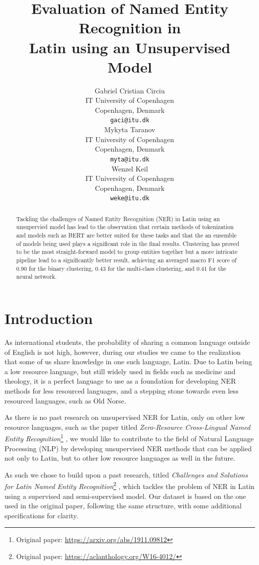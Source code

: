 \documentclass[11pt]{article}
\title{Evaluation of Named Entity Recognition in \\ Latin using an Unsupervised Model}
\author{
  Gabriel Cristian Circiu \\
  IT University of Copenhagen \\ Copenhagen, Denmark \\
  \texttt{gaci@itu.dk} \\\And
  Mykyta Taranov \\
  IT University of Copenhagen \\ Copenhagen, Denmark \\
  \texttt{myta@itu.dk} \\\And
  Wenzel Keil \\
  IT University of Copenhagen \\ Copenhagen, Denmark \\
  \texttt{weke@itu.dk}
}
\begin{document}
\maketitle
\begin{abstract}
Tackling the challenges of Named Entity Recognition (NER) in Latin using an unsupervied model has lead to the observation that certain methods of
tokenization and models such as BERT are better suited for these tasks and that the an ensemble of models being used plays a significant
role in the final results.
Clustering has proved to be the most straight-forward model to group entities together but a more intricate pipeline lead to a significantly 
better result, achieving an averaged macro F1 score of 0.90 for the binary clustering, 0.43 for the multi-class clustering, 
and 0.41 for the neural network.
\end{abstract}

\section{Introduction}

As international students, the probability of sharing a common language outside of English is not high, however, during our studies we came to the 
realization that some of us share knowledge in one such language, Latin. Due to Latin being a low resource language, but still widely used in fields
such as medicine and theology, it is a perfect language to use as a foundation for developing NER methods for less resourced languages, and a
stepping stone towards even less resourced languages, such as Old Norse.

As there is no past research on unsupervised NER for Latin, only on other low resource languages, such as the paper titled
\textit{Zero-Resource Cross-Lingual Named Entity Recognition}\footnote{Original paper: \url{https://arxiv.org/abs/1911.09812}}
\cite{bari2019zeroresourcecrosslingualnamedentity}, we would like to contribute to the field of Natural Language Processing (NLP) by
developing unsupervised NER methods that can be applied not only to Latin, but to other low resource languages as well in the future.

As such we chose to build upon a past research, titled 
\textit{Challenges and Solutions for Latin Named Entity Recognition}\footnote{Original paper: \url{https://aclanthology.org/W16-4012/}}
\cite{erdmann-etal-2016-challenges}, which tackles the problem of NER in Latin using a supervised and semi-supervised model.
Our dataset is based on the one used in the original paper, following the same structure, with some additional specifications for clarity.
\end{document}

